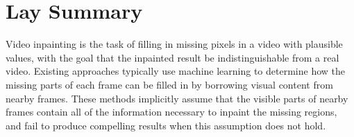 

\chapter{Lay Summary}

Video inpainting is the task of filling in missing pixels in a video with plausible values, with the goal that the inpainted result be indistinguishable from a real video. Existing approaches typically use machine learning to determine how the missing parts of each frame can be filled in by borrowing visual content from nearby frames. These methods implicitly assume that the visible parts of nearby frames contain all of the information necessary to inpaint the missing regions, and fail to produce compelling results when this assumption does not hold. 